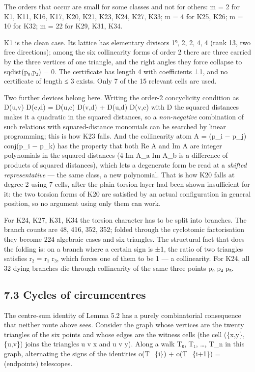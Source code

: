 \documentclass[11pt,a4paper]{article}
\theoremstyle{named}
\begin{document}
The orders that occur are small for some classes and not for others: m = 2 for K1, K11, K16, K17, K20, K21, K23, K24, K27, K33; m = 4 for K25, K26; m = 10 for K32; m = 22 for K29, K31, K34.

K1 is the clean case. Its lattice has elementary divisors 1⁹, 2, 2, 4, 4 (rank 13, two free directions); among the six collinearity forms of order 2 there are three carried by the three vertices of one triangle, and the right angles they force collapse to sqdist(p₀,p₂) = 0. The certificate has length 4 with coefficients ±1, and no certificate of length ≤ 3 exists. Only 7 of the 15 relevant cells are used.

Two further devices belong here. Writing the order-2 concyclicity condition as D(u,v) D(c,d) = D(u,c) D(v,d) + D(u,d) D(v,c) with D the squared distances makes it a quadratic in the squared distances, so a \textit{non-negative} combination of such relations with squared-distance monomials can be searched by linear programming; this is how K23 falls. And the collinearity atom A = (p\_i − p\_j) conj(p\_i − p\_k) has the property that both Re A and Im A are integer polynomials in the squared distances (4 Im A\_a Im A\_b is a difference of products of squared distances), which lets a degenerate form be read at a \textit{shifted representative} — the same class, a new polynomial. That is how K20 falls at degree 2 using 7 cells, after the plain torsion layer had been shown insufficient for it: the two torsion forms of K20 are satisfied by an actual configuration in general position, so no argument using only them can work.

For K24, K27, K31, K34 the torsion character has to be split into branches. The branch counts are 48, 416, 352, 352; folded through the cyclotomic factorisation they become 224 algebraic cases and six triangles. The structural fact that does the folding is: on a branch where a certain sign is ±1, the ratio of two triangles satisfies r₂ = r₁ r₃, which forces one of them to be 1 — a collinearity. For K24, all 32 dying branches die through collinearity of the same three points p₀ p₄ p₅.

\subsection*{7.3 Cycles of circumcentres}

The centre-sum identity of Lemma 5.2 has a purely combinatorial consequence that neither route above sees. Consider the graph whose vertices are the twenty triangles of the six points and whose edges are the witness cells (the cell (\{x,y\},\{u,v\}) joins the triangles u v x and u v y). Along a walk T₀, T₁, …, T\_n in this graph, alternating the signs of the identities o(T\_\{i\}) + o(T\_\{i+1\}) = (endpoints) telescopes.
\end{document}

